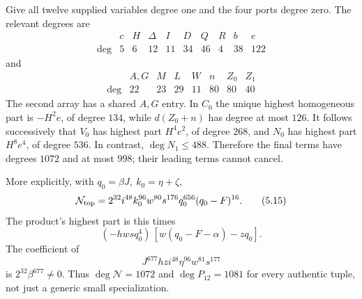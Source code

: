 Give all twelve supplied variables degree one and the four ports
degree zero. The relevant degrees are
\[
\begin{array}{c|rrrrrrrrr}
 &c&H&\Delta&I&D&Q&R&b&e\\ \hline
\deg&5&6&12&11&34&46&4&38&122
\end{array}
\]
and
\[
\begin{array}{c|rrrrrrr}
 &A,G&M&L& W&n&Z_0&Z_1\\ \hline
\deg&22&23&29&11&80&80&40
\end{array}
\]
The second array has a shared \(A,G\) entry.
In \(C_0\) the unique highest homogeneous part is \(-H^2e\),
of degree \(134\), while \(d(Z_0+n)\) has degree at most \(126\).
It follows successively that \(V_0\) has highest part \(H^4e^2\),
of degree \(268\), and \(N_0\) has highest part \(H^8e^4\),
of degree \(536\). In contrast, \(\deg N_1\le488\).
Therefore the final terms have degrees \(1072\) and at most \(998\);
their leading terms cannot cancel.

More explicitly, with \(q_0=\beta J,\ k_0=\eta+\zeta\),
\[
\mathcal N_{\rm top}
=2^{32}i^{48}k_0^{96}w^{80}s^{176}q_0^{656}(q_0-F)^{16}.
\tag{5.15}
\]
The product's highest part is this times
\[
(-hwsq_0^4)\,[w(q_0-F-\alpha)-zq_0].
\]
The coefficient of
\[
J^{677}hzi^{48}\eta^{96}w^{81}s^{177}
\]
is \(2^{32}\beta^{677}\ne0\).
Thus \(\deg\mathcal N=1072\) and \(\deg P_{12}=1081\)
for every authentic tuple, not just a generic small specialization.
